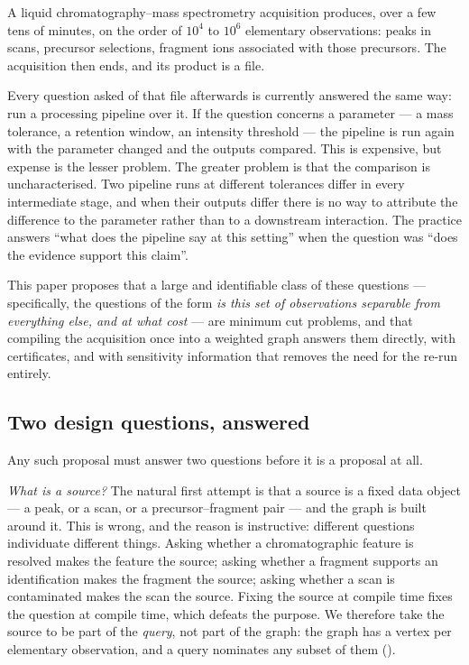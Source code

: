 \documentclass[11pt,a4paper]{article}
\theoremstyle{definition}
\theoremstyle{remark}
\begin{document}
A liquid chromatography--mass spectrometry acquisition produces, over a
few tens of minutes, on the order of $10^4$ to $10^6$ elementary
observations: peaks in scans, precursor selections, fragment ions
associated with those precursors. The acquisition then ends, and its
product is a file.

Every question asked of that file afterwards is currently answered the
same way: run a processing pipeline over it. If the question concerns a
parameter --- a mass tolerance, a retention window, an intensity
threshold --- the pipeline is run again with the parameter changed and
the outputs compared. This is expensive, but expense is the lesser
problem. The greater problem is that the comparison is uncharacterised.
Two pipeline runs at different tolerances differ in every intermediate
stage, and when their outputs differ there is no way to attribute the
difference to the parameter rather than to a downstream interaction. The
practice answers ``what does the pipeline say at this setting'' when the
question was ``does the evidence support this claim''.

This paper proposes that a large and identifiable class of these
questions --- specifically, the questions of the form \emph{is this set
of observations separable from everything else, and at what cost} --- are
minimum cut problems, and that compiling the acquisition once into a
weighted graph answers them directly, with certificates, and with
sensitivity information that removes the need for the re-run entirely.

\subsection{Two design questions, answered}

Any such proposal must answer two questions before it is a proposal at
all.

\emph{What is a source?} The natural first attempt is that a source is a
fixed data object --- a peak, or a scan, or a precursor--fragment pair
--- and the graph is built around it. This is wrong, and the reason is
instructive: different questions individuate different things. Asking
whether a chromatographic feature is resolved makes the feature the
source; asking whether a fragment supports an identification makes the
fragment the source; asking whether a scan is contaminated makes the scan
the source. Fixing the source at compile time fixes the question at
compile time, which defeats the purpose. We therefore take the source to
be part of the \emph{query}, not part of the graph: the graph has a
vertex per elementary observation, and a query nominates any subset of
them ().
\end{document}

